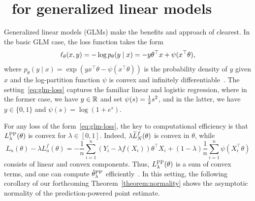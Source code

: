 
\section{\ppipptitle~for generalized linear models}
\label{sec:ppi++_glms}

Generalized linear models (GLMs) make the benefits and approach of \ppipp
clearest.  In the basic GLM case, the loss function takes the form
\begin{equation}
    \label{eq:glm-loss}
    \ell_\theta(x,y) = -\log p_\theta(y \mid x)
    = -y\theta^\top x + \psi(x^\top\theta),
\end{equation}
where $p_\theta(y \mid x) = \exp(y x^\top \theta - \psi(x^\top \theta))$ is
the probability density of $y$ given $x$ and the log-partition function
$\psi$ is convex and infinitely differentiable~\cite{Brown86}. 
The setting~\eqref{eq:glm-loss} captures the familiar linear and logistic regression, where in the former case, we have $y \in \mathbb{R}$ and set $\psi(s) = \frac{1}{2} s^2$, and in the latter, we have $y \in \{0, 1\}$ and $\psi(s) = \log (1+ e^{s})$.

For any loss of the form~\eqref{eq:glm-loss}, the key to computational
efficiency is that $L^{\mathrm{PP}}_{\lambda}(\theta)$ is convex for $\lambda \in [0, 1]$.
Indeed,  $\lambda \widetilde{L}_N^f(\theta)$ is convex in $\theta$,
while
\begin{equation*}
  L_n(\theta) - \lambda L_n^f(\theta)
  = - \frac{1}{n}
  \sum_{i=1}^n (Y_i - \lambda f(X_i))\theta^\top X_i
  +  (1-\lambda) \frac{1}{n} \sum_{i=1}^n\psi(X_i^\top \theta)
\end{equation*}
consists of linear and convex components. 
Thus, $L^{\mathrm{PP}}_{\lambda}(\theta)$ is a sum of convex terms, and one can compute $\hat{\theta}^{\mathrm{PP}}_{\lambda}$ efficiently~\cite{BoydVa04}.
In this setting, the following corollary of our forthcoming
Theorem~\ref{theorem:normality} shows the asymptotic normality of the prediction-powered point estimate.

